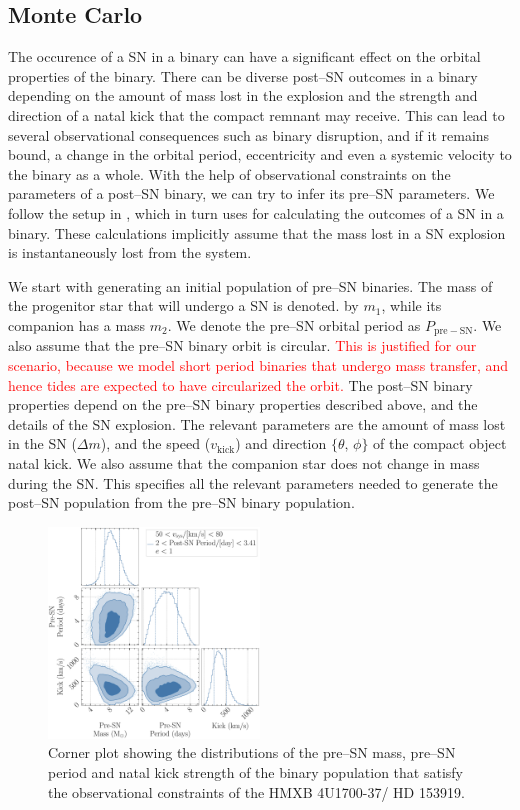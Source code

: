 \documentclass[linenumbers,trackchanges,twocolumn]{aastex701}
\newcommand{\red}{\textcolor{red}}
\begin{document}
\subsection{Monte Carlo}

The occurence of a SN in a binary can have a significant effect on the orbital properties of the binary. There can be diverse post--SN outcomes in a binary depending on the amount of mass lost in the explosion and the strength and direction of a natal kick that the compact remnant may receive. This can lead to several observational consequences such as binary disruption, and if it remains bound, a change in the orbital period, eccentricity and even a systemic velocity to the binary as a whole. With the help of observational constraints on the parameters of a post--SN binary, we can try to infer its pre--SN parameters. We follow the setup in \cite{2024OJAp....7E..38E}, which in turn uses \cite{1994astro.ph.12023B} for calculating the outcomes of a SN in a binary. These calculations implicitly assume that the mass lost in a SN explosion is instantaneously lost from the system.

We start with generating an initial population of pre--SN binaries. The mass of the progenitor star that will undergo a SN is denoted. by $m_1$, while its companion has a mass $m_2$. We denote the pre--SN orbital period as $P_{\mathrm{pre-SN}}$. We also assume that the pre--SN binary orbit is circular. \red{This is justified for our scenario, because we model short period binaries that undergo mass transfer, and hence tides are expected to have circularized the orbit.} The post--SN binary properties depend on the pre--SN binary properties described above, and the details of the SN explosion. The relevant parameters are the amount of mass lost in the SN ($\Delta m$), and the speed ($v_{\mathrm{kick}}$) and direction $\{\theta, \,\phi\}$ of the compact object natal kick. We also assume that the companion star does not change in mass during the SN. This specifies all the relevant parameters needed to generate the post--SN population from the pre--SN binary population. 

\begin{figure}[htbp]
    \centering
    \includegraphics[width=0.5\textwidth]{xrb-monte-carlo-mass-period-kick.pdf}
    \caption{Corner plot showing the distributions of the pre--SN mass, pre--SN period and natal kick strength of the binary population that satisfy the observational constraints of the HMXB 4U1700-37/ HD 153919.}
    \label{fig:xrb_monte_carlo}
\end{figure}
\end{document}
